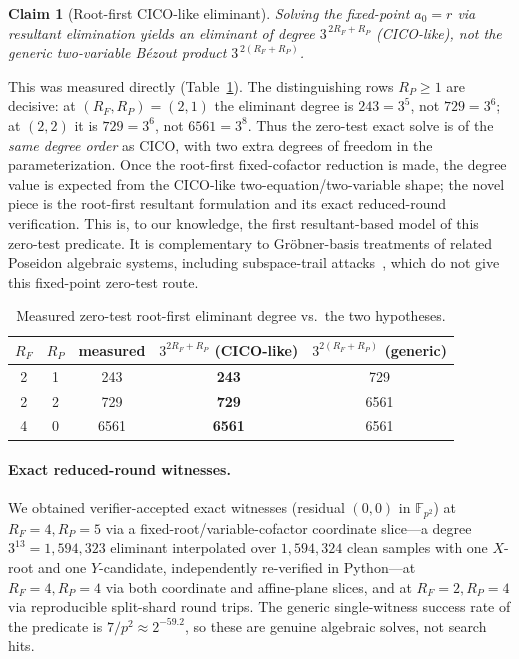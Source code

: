 \documentclass[11pt]{article}
\newcommand{\Fpp}{\mathbb{F}_{p^2}}
\newcommand{\RF}{R_F}
\newcommand{\RP}{R_P}
\newcommand{\Verified}[1]{}
\newcommand{\Verified}[1]{\marginpar{\footnotesize\textcolor{blue}{[V: #1]}}}
\theoremstyle{plain}
\newtheorem{claim}{Claim}
\begin{document}
\begin{claim}[Root-first CICO-like eliminant]\label{cl:ztcollapse}
Solving the fixed-point $a_0=r$ via resultant elimination yields an eliminant of
degree $3^{\,2\RF+\RP}$ (CICO-like), \emph{not} the generic two-variable B\'ezout
product $3^{\,2(\RF+\RP)}$. \Verified{zerotest\_calibrate}
\end{claim}

This was measured directly (Table~\ref{tab:ztcal}). The distinguishing rows
$\RP\ge 1$ are decisive: at $(\RF,\RP)=(2,1)$ the eliminant degree is $243=3^5$, not
$729=3^6$; at $(2,2)$ it is $729=3^6$, not $6561=3^8$. Thus the zero-test exact solve
is of the \emph{same degree order} as CICO, with two extra degrees of freedom in the
parameterization. Once the root-first fixed-cofactor reduction is made, the degree
value is expected from the CICO-like two-equation/two-variable shape; the novel
piece is the root-first resultant formulation and its exact reduced-round
verification. This is, to our knowledge, the first resultant-based model of this
zero-test predicate. It is complementary to Gr\"obner-basis treatments of related
Poseidon algebraic systems, including subspace-trail attacks~\cite{gbsubspace},
which do not give this fixed-point zero-test route.

\begin{table}[ht]\centering
\caption{Measured zero-test root-first eliminant degree vs.\ the two hypotheses.}
\label{tab:ztcal}
\begin{tabular}{ccccc}
\toprule
$\RF$ & $\RP$ & measured & $3^{2\RF+\RP}$ (CICO-like) & $3^{2(\RF+\RP)}$ (generic)\\
\midrule
2 & 1 & 243  & \textbf{243}  & 729 \\
2 & 2 & 729  & \textbf{729}  & 6561 \\
4 & 0 & 6561 & \textbf{6561} & 6561 \\
\bottomrule
\end{tabular}
\end{table}

\paragraph{Exact reduced-round witnesses.}
We obtained verifier-accepted exact witnesses (residual $(0,0)$ in $\Fpp$) at
$\RF=4,\RP=5$ via a fixed-root/variable-cofactor coordinate slice---a degree
$3^{13}=1{,}594{,}323$ eliminant interpolated over $1{,}594{,}324$ clean samples
with one $X$-root and one $Y$-candidate, independently re-verified in Python---at
$\RF=4,\RP=4$ via both coordinate and affine-plane slices, and at $\RF=2,\RP=4$
via reproducible split-shard round trips.
\Verified{VALIDATION.md; artifacts} The generic single-witness success rate of the
predicate is $7/p^2 \approx 2^{-59.2}$, so these are genuine algebraic solves, not
search hits.
\end{document}
